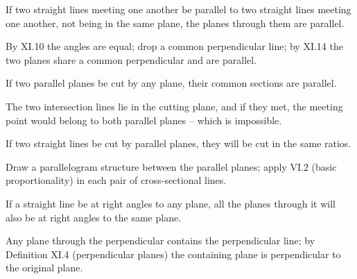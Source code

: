 \documentclass{rrxiv}
\begin{document}
\begin{claim}
\label{prop:XI.15}
If two straight lines meeting one another be parallel to two straight
lines meeting one another, not being in the same plane, the planes
through them are parallel.
\end{claim}
\begin{evidence}[Proof of XI.15]
\label{ev:XI.15}
By XI.10 the angles are equal; drop a common perpendicular line; by
XI.14 the two planes share a common perpendicular and are parallel.
\end{evidence}

\begin{claim}
\label{prop:XI.16}
If two parallel planes be cut by any plane, their common sections
are parallel.
\end{claim}
\begin{evidence}[Proof of XI.16]
\label{ev:XI.16}
The two intersection lines lie in the cutting plane, and if they
met, the meeting point would belong to both parallel planes -- which
is impossible.
\end{evidence}

\begin{claim}
\label{prop:XI.17}
If two straight lines be cut by parallel planes, they will be cut in
the same ratios.
\end{claim}
\begin{evidence}[Proof of XI.17]
\label{ev:XI.17}
Draw a parallelogram structure between the parallel planes; apply
VI.2 (basic proportionality) in each pair of cross-sectional lines.
\end{evidence}

\begin{claim}
\label{prop:XI.18}
If a straight line be at right angles to any plane, all the planes
through it will also be at right angles to the same plane.
\end{claim}
\begin{evidence}[Proof of XI.18]
\label{ev:XI.18}
Any plane through the perpendicular contains the perpendicular line;
by Definition XI.4 (perpendicular planes) the containing plane is
perpendicular to the original plane.
\end{evidence}
\end{document}
